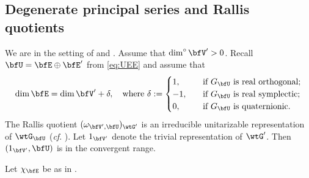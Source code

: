 \documentclass[12pt,a4paper]{amsart}
\numberwithin{equation}{section}
\theoremstyle{remark}
\def\abfV{\bfV'}
\def\dimo{\dim^\circ}
\def\tGVar{\wtG'}
\begin{document}
\subsection{Degenerate principal series and Rallis quotients}\label{sec:DPandRQ}

We are in the setting of  and . Assume that $\dimo \abfV>0$. Recall $\bfU=\bfE\oplus \bfE'$ from \eqref{eq:UEE}
and assume that
\begin{equation}
  \label{dimu}
  \dim \bfE =\dim \abfV+\delta , \quad  \textrm{where } \delta :=\begin{cases}
        1, \quad&\text{if $G_\bfU$ is real orthogonal;} \\
    -1,\quad& \text{if $G_\bfU$ is real symplectic;} \\
    0, \quad&\text{if $G_\bfU$ is quaternionic. }
  \end{cases}
\end{equation}
The Rallis quotient
$(\omega_{\abfV,\bfU})_{\tGVar}$ is an irreducible unitarizable
representation of $\wtG_{\bfU}$ (\emph{cf}. \cite{Ra,KR,Ya}).
Let $1_{\abfV}$ denote the trivial representation of $\tGVar$.  Then
$(1_{\abfV}, \bfU)$ is in the convergent range.

Let $\chi_{\bfE}$ be as in . 


\end{document}
